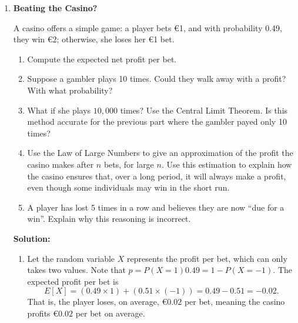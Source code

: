 \documentclass[12pt]{article}
\newif\ifsolutions
\begin{document}
\begin{enumerate}
\begin{enumerate}[label=(\alph*)]
        For \( n = 100 \):
        \[
        \sigma_{\bar{Y}} = \frac{10}{\sqrt{100}} \approx 1.29, \quad Z = \frac{153 - 150}{1} = 3.
        \]
        In this case $P(Z > 3) = \texttt{pnorm(3, lower.tail = FALSE)} \approx 0.0013$.
    \end{enumerate} 
        
    \textbf{Conclusion:} While individual probabilities depend on the normal assumption, the Central Limit Theorem ensures that for large \( n \), the probability of observing an extreme sample mean remains negligible.
    
    \fi \color{black}
    
    \item \textbf{Beating the Casino?}

    A casino offers a simple game: a player bets €1, and with probability 0.49, they win €2; otherwise, she loses her €1 bet.

    \begin{enumerate}[label=(\alph*)]
        \item Compute the expected net profit per bet.
        \item Suppose a gambler plays 10 times. Could they walk away with a profit? With what probability? 
        \item What if she plays $10,000$ times? Use the Central Limit Theorem. Is this method accurate for the previous part where the gambler payed only 10 times?
        \item Use the Law of Large Numbers to give an approximation of the profit the casino makes after $n$ bets, for large $n$. Use this estimation to explain how the casino ensures that, over a long period, it will always make a profit, even though some individuals may win in the short run.
        \item A player has lost 5 times in a row and believes they are now ``due for a win''. Explain why this reasoning is incorrect.
    \end{enumerate}

    
    \ifsolutions \color{blue} \textbf{Solution:} \\
    \begin{enumerate}
        \item Let the random variable $X$ represents the profit per bet, which can only takes two values. Note that $p = P(X = 1) 0.49 = 1- P(X=-1)$. The expected profit per bet is
        \[
        E[X] = (0.49 \times 1) + (0.51 \times (-1)) = 0.49 - 0.51 = -0.02.
        \]
        That is, the player loses, on average, €$0.02$ per bet, meaning the casino profits €$0.02$ per bet on average.
        

\end{enumerate}
\end{enumerate}
\end{document}
